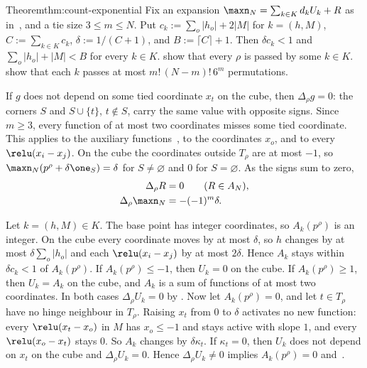 \begin{Proof}{Theorem}{thm:count-exponential}
Fix an expansion $\maxn_N=\sum_{k\in K}d_kU_k+R$ as
in~, and a tie size $3\leq m\leq N$. Put
$c_k:=\sum_o|h_o|+2|M|$ for $k=(h,M)$, $C:=\sum_{k\in K}c_k$,
$\delta:=1/(C+1)$, and $B:=\lceil C\rceil+1$. Then $\delta c_k<1$ and
$\sum_o|h_o|+|M|<B$ for every $k\in K$.
show that every $\rho$ is passed by some $k\in K$.
show that each $k$ passes at most $m!\,(N-m)!\,6^m$ permutations.

If $g$ does not depend on some tied coordinate $x_t$ on the cube, then
$\Delta_\rho g=0$: the corners $S$ and $S\cup\{t\}$, $t\notin S$, carry the
same value with opposite signs. Since $m\geq3$, every function of at most two
coordinates misses some tied coordinate. This applies to the auxiliary
functions~, to the coordinates $x_o$, and to every
$\relu(x_i-x_j)$. On the cube the coordinates outside $T_\rho$ are at most
$-1$, so $\maxn_N(p^\rho+\delta\one_S)=\delta$ for $S\neq\varnothing$ and $0$
for $S=\varnothing$. As the signs sum to zero,
\begin{align}
 \Delta_\rho R&=0\qquad(R\in A_N),\label{eq:mixed-auxiliary}\\
 \Delta_\rho\maxn_N&=-(-1)^m\delta.\label{eq:mixed-maximum}
\end{align}

Let $k=(h,M)\in K$. The base point has integer coordinates, so $A_k(p^\rho)$
is an integer. On the cube every coordinate moves by at most $\delta$, so
$h$ changes by at most $\delta\sum_o|h_o|$ and each $\relu(x_i-x_j)$ by at
most $2\delta$. Hence $A_k$ stays within $\delta c_k<1$ of $A_k(p^\rho)$. If $A_k(p^\rho)\leq-1$,
then $U_k=0$ on the cube. If $A_k(p^\rho)\geq1$, then $U_k=A_k$ on the cube,
and $A_k$ is a sum of functions of at most two coordinates. In both cases
$\Delta_\rho U_k=0$ by . Now let
$A_k(p^\rho)=0$, and let $t\in T_\rho$ have no hinge neighbour in $T_\rho$.
Raising $x_t$ from $0$ to $\delta$ activates no new function: every
$\relu(x_t-x_o)$ in $M$ has $x_o\leq-1$ and stays active with slope $1$,
and every $\relu(x_o-x_t)$ stays $0$. So $A_k$ changes by $\delta\kappa_t$. If
$\kappa_t=0$, then $U_k$ does not depend on $x_t$ on the cube and
$\Delta_\rho U_k=0$. Hence $\Delta_\rho U_k\neq0$ implies $A_k(p^\rho)=0$
and~.


\end{Proof}
